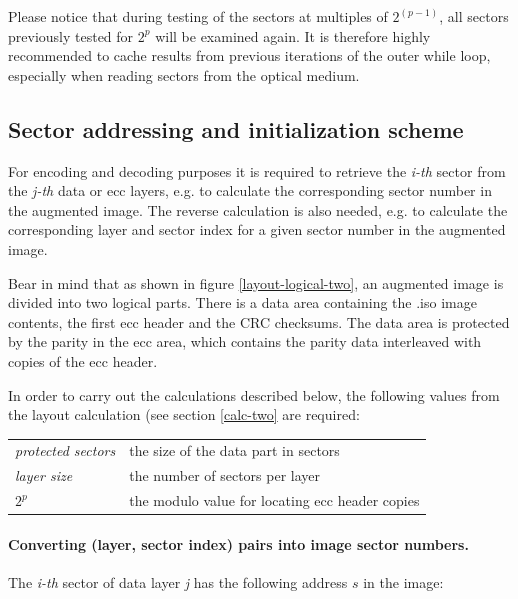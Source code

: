 \medskip

Please notice that during testing of the sectors at multiples of $2^{(p-1)}$,
all sectors previously tested for $2^p$ will be examined again. It is therefore
highly recommended to cache results from previous iterations of the outer
while loop, especially when reading sectors from the optical medium.



\subsection{Sector addressing and initialization scheme}
\label{addressing-two}

For encoding and decoding purposes it is required to retrieve the
{\em i-th} sector from the {\em j-th} data or ecc layers, e.g. to calculate
the corresponding sector number in the augmented image. 
The reverse calculation is also needed, e.g. to calculate the
corresponding layer and sector index for a given sector number
in the augmented image.

\smallskip

Bear in mind that as shown in figure \ref{layout-logical-two}, an augmented image 
is divided into two logical parts. There is a data area containing 
the .iso image contents, the first ecc header and the CRC checksums.
The data area is protected by the parity in the ecc area, which contains
the parity data interleaved with copies of the ecc header. 

\smallskip

In order to carry out the calculations described below, the following
values from the layout calculation (see section \ref{calc-two} are required:

\bigskip

\begin{tabular}{lp{10cm}}
{\em protected sectors} & the size of the data part in sectors \\
{\em layer size} & the number of sectors per layer \\
{\em $2^p$} & the modulo value for locating ecc header copies \\
\end{tabular}

\paragraph{Converting (layer, sector index) pairs into image sector numbers.}

The {\em i-th} sector of data layer {\em j} has the following address $s$ in the image:

